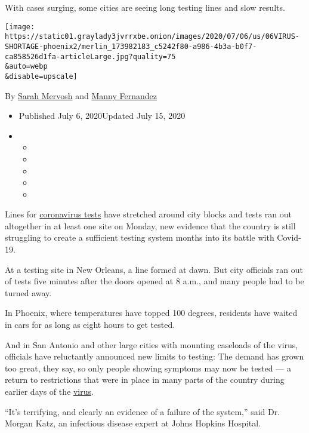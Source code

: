 With cases surging, some cities are seeing long testing lines and slow
results.

\texttt{[image: https://static01.graylady3jvrrxbe.onion/images/2020/07/06/us/06VIRUS-SHORTAGE-phoenix2/merlin\_173982183\_c5242f80-a986-4b3a-b0f7-ca858526d1fa-articleLarge.jpg?quality=75\\\&auto=webp\\\&disable=upscale]}

By \href{https://www.nytimes3xbfgragh.onion/by/sarah-mervosh}{Sarah
Mervosh} and
\href{https://www.nytimes3xbfgragh.onion/by/manny-fernandez}{Manny
Fernandez}

\begin{itemize}
\item
  Published July 6, 2020Updated July 15, 2020
\item
  \begin{itemize}
  \item
  \item
  \item
  \item
  \item
  \end{itemize}
\end{itemize}

Lines for
\href{https://www.nytimes3xbfgragh.onion/2020/07/15/parenting/kids-covid-19-test.html}{coronavirus
tests} have stretched around city blocks and tests ran out altogether in
at least one site on Monday, new evidence that the country is still
struggling to create a sufficient testing system months into its battle
with Covid-19.

At a testing site in New Orleans, a line formed at dawn. But city
officials ran out of tests five minutes after the doors opened at 8
a.m., and many people had to be turned away.

In Phoenix, where temperatures have topped 100 degrees, residents have
waited in cars for as long as eight hours to get tested.

And in San Antonio and other large cities with mounting caseloads of the
virus, officials have reluctantly announced new limits to testing: The
demand has grown too great, they say, so only people showing symptoms
may now be tested --- a return to restrictions that were in place in
many parts of the country during earlier days of the
\href{https://www.nytimes3xbfgragh.onion/2020/07/15/parenting/kids-covid-19-test.html}{virus}.

``It's terrifying, and clearly an evidence of a failure of the system,''
said Dr. Morgan Katz, an infectious disease expert at Johns Hopkins
Hospital.

